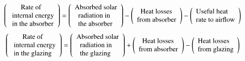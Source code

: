 \begin{equation*}
\left( \begin{array}{l}
{\rm{\ \ \ \ \ \ Rate \ of}}\\
{\rm{\ internal \ energy }}\\
{\rm{\ in \ the \ absorber}}
\end{array} \right) = \left( \begin{array}{l}
{\rm{Absorbed \ solar}}\\
{\rm{\ \ radiation \ in}}\\
{\rm{\ \ the \ absorber}}
\end{array} \right) - \left( \begin{array}{l}
{\rm{\ \ Heat \ losses}}\\
{\rm{from \ absorber}}
\end{array} \right) - \left( \begin{array}{l}
{\rm{Useful \ heat}}\\
{\rm{ rate \ to \ airflow}}
\end{array} \right)
\label{text_equation_ABS}
\end{equation*}
\vspace*{-0.10cm}
\begin{equation*}
\left( \begin{array}{l}
{\rm{\ \ \ \ \ \ Rate \ of}}\\
{\rm{\ internal \ energy }}\\
{\rm{\ in \ the \ glazing}}
\end{array} \right) = \left( \begin{array}{l}
{\rm{Absorbed \ solar}}\\
{\rm{\ \ radiation \ in}}\\
{\rm{\ \ the \ glazing}}
\end{array} \right) + \left( \begin{array}{l}
{\rm{\ \ Heat \ losses}}\\
{\rm{from \ absorber}}
\end{array} \right) - \left( \begin{array}{l}
{\rm{Heat \ losses}}\\
{\rm{from \ glazing}}
\end{array} \right)
\label{text_equation_GLAZ}
\end{equation*}
\vspace*{-0.10cm}

